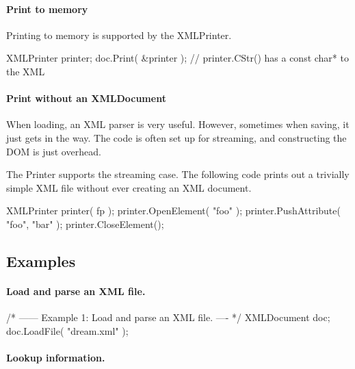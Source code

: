 \paragraph*{Print to memory}

Printing to memory is supported by the X\+M\+L\+Printer. \begin{DoxyVerb}XMLPrinter printer;
doc.Print( &printer );
// printer.CStr() has a const char* to the XML
\end{DoxyVerb}


\paragraph*{Print without an X\+M\+L\+Document}

When loading, an X\+ML parser is very useful. However, sometimes when saving, it just gets in the way. The code is often set up for streaming, and constructing the D\+OM is just overhead.

The Printer supports the streaming case. The following code prints out a trivially simple X\+ML file without ever creating an X\+ML document. \begin{DoxyVerb}XMLPrinter printer( fp );
printer.OpenElement( "foo" );
printer.PushAttribute( "foo", "bar" );
printer.CloseElement();
\end{DoxyVerb}


\subsection*{Examples }

\paragraph*{Load and parse an X\+ML file.}

\begin{DoxyVerb}/* ------ Example 1: Load and parse an XML file. ---- */    
{
    XMLDocument doc;
    doc.LoadFile( "dream.xml" );
}
\end{DoxyVerb}


\paragraph*{Lookup information.}

